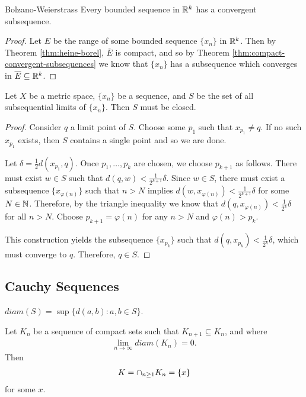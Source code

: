 \begin{thm}{Bolzano-Weierstrass}\proofbreak
    Every bounded sequence in $\mathbb{R}^{k}$ has a convergent subsequence.
\end{thm}

\begin{proof}
    Let $E$ be the range of some bounded sequence $\{x_n\}$ in $\mathbb{R}^k$. Then by Theorem \ref{thm:heine-borel}, $\overline{E}$ is compact, and so by Theorem \ref{thm:compact-convergent-subsequences} we know that $\{x_n\}$ has a subsequence which converges in $\overline{E} \subseteq \mathbb{R}^k$.
\end{proof}

\begin{thm}
    Let $X$ be a metric space, $\{x_n\}$ be a sequence, and $S$ be the set of all subsequential limits of $\{x_n\}$. Then $S$ must be closed.
\end{thm}

\begin{proof}
    Consider $q$ a limit point of $S$. Choose some $p_1$ such that $x_{p_1} \neq q$. If no such $x_{p_1}$ exists, then $S$ contains a single point and so we are done.

    Let $\delta = \frac{1}{2}d(x_{p_1}, q)$. Once $p_1, \ldots, p_k$ are chosen, we choose $p_{k+1}$ as follows. There must exist $w \in S$ such that $d(q, w) < \frac{1}{2^{k+1}}\delta$. Since $w \in S$, there must exist a subsequence $\{x_{\varphi(n)}\}$ such that $n > N$ implies $d(w, x_{\varphi(n)}) < \frac{1}{2^{k+1}}\delta$ for some $N \in \mathbb{N}$. Therefore, by the triangle inequality we know that $d(q, x_{\varphi(n)}) < \frac{1}{2^{k}}\delta$ for all $n > N$. Choose $p_{k+1} = \varphi(n)$ for any $n > N$ and $\varphi(n) > p_k$.

    This construction yields the subsequence $\{x_{p_k}\}$ such that $d(q, x_{p_k}) < \frac{1}{2^{k}}\delta$, which must converge to $q$. Therefore, $q \in S$.
\end{proof}

\subsection{Cauchy Sequences}

\begin{defn}
    $diam(S) = \sup \{d(a, b) : a, b \in S\}$.
\end{defn}

\begin{thm}
    Let $K_n$ be a sequence of compact sets such that $K_{n+1} \subseteq K_n$, and where
    \begin{align*}
        \lim_{n\to\infty}diam(K_n) = 0.
    \end{align*}
    Then
    \begin{align*}
        K = \cap_{n\geq 1}K_n = \{x\}
    \end{align*}
    for some $x$.
\end{thm}

